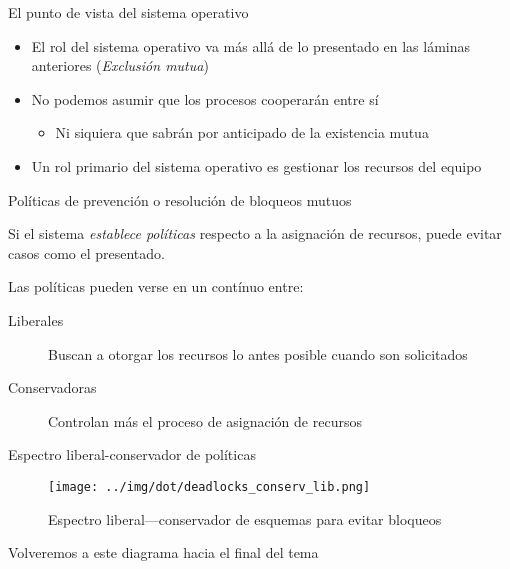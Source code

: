 \documentclass[presentation]{beamer}
\begin{document}
\begin{frame}[label={sec:orge93552b}]{El punto de vista del sistema operativo}
\begin{itemize}
\item El rol del sistema operativo va más allá de lo presentado en las
láminas anteriores (\emph{Exclusión mutua})
\item No podemos asumir que los procesos cooperarán entre sí
\begin{itemize}
\item Ni siquiera que sabrán por anticipado de la existencia mutua
\end{itemize}
\item Un rol primario del sistema operativo es gestionar los recursos del
equipo
\end{itemize}
\end{frame}

\begin{frame}[label={sec:org6085833}]{Políticas de prevención o resolución de bloqueos mutuos}
\begin{center}
Si el sistema \emph{establece políticas} respecto a la asignación de
recursos, puede evitar casos como el presentado.

Las políticas pueden verse en un contínuo entre:
\end{center}
\begin{description}
\item[{Liberales}] Buscan a otorgar los recursos lo antes posible cuando
son solicitados
\item[{Conservadoras}] Controlan más el proceso de asignación de recursos
\end{description}
\end{frame}

\begin{frame}[label={sec:orgca8bbbe}]{Espectro liberal-conservador de políticas}
\begin{figure}[htbp]
\centering
\texttt{[image: ../img/dot/deadlocks\_conserv\_lib.png]}
\caption{Espectro liberal—conservador de esquemas para evitar bloqueos}
\end{figure}

\begin{center}
{\scriptsize Volveremos a este diagrama hacia el final del tema}
\end{center}
\end{frame}
\end{document}
